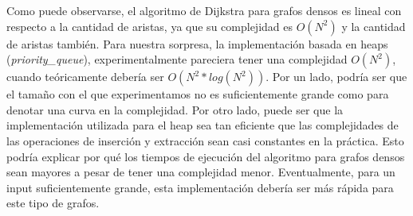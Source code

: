 Como puede observarse, el algoritmo de Dijkstra para grafos densos es lineal con respecto a la cantidad de aristas, ya que su complejidad es $O(N^2)$ y la cantidad de aristas también. Para nuestra sorpresa, la implementación basada en heaps (\textit{priority\_queue}), experimentalmente pareciera tener una complejidad $O(N^2)$, cuando teóricamente debería ser $O(N^2 * log(N^2))$. Por un lado, podría ser que el tamaño con el que experimentamos no es suficientemente grande como para denotar una curva en la complejidad. Por otro lado, puede ser que la implementación utilizada para el heap sea tan eficiente que las complejidades de las operaciones de inserción y extracción sean casi constantes en la práctica. Esto podría explicar por qué los tiempos de ejecución del algoritmo para grafos densos sean mayores a pesar de tener una complejidad menor. Eventualmente, para un input suficientemente grande, esta implementación debería ser más rápida para este tipo de grafos.